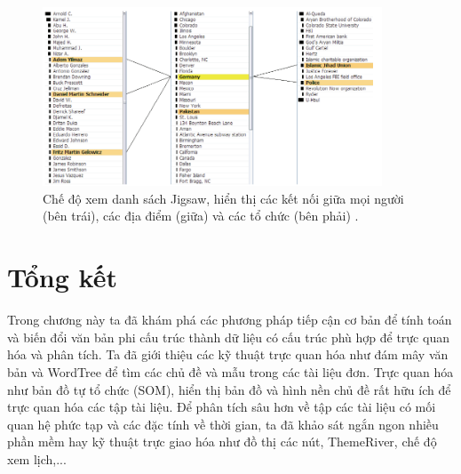 \documentclass[14pt, a4paper]{article}
\numberwithin{equation}{section}
\numberwithin{figure}{section}
\numberwithin{dl}{section}
\numberwithin{md}{section}
\numberwithin{bd}{section}
\numberwithin{dn}{section}
\numberwithin{hq}{section}
\begin{document}
    \begin{figure}[h!]
        \centering
        \includegraphics[width=0.9\textwidth]{20.png}
        \caption{Chế độ xem danh sách Jigsaw, hiển thị các kết nối giữa mọi người (bên trái), các địa điểm (giữa) và các tổ chức (bên phải) \cite{155}.}
        \label{fig:20}
    \end{figure}

    \section{Tổng kết}

    Trong chương này ta đã khám phá các phương pháp tiếp cận cơ bản để tính toán và biến đổi văn bản phi cấu trúc thành dữ liệu có cấu trúc phù hợp để trực quan hóa và phân tích.
    Ta đã giới thiệu các kỹ thuật trực quan hóa như đám mây văn bản và WordTree để tìm các chủ đề và mẫu trong các tài liệu đơn.
    Trực quan hóa như bản đồ tự tổ chức (SOM), hiển thị bản đồ và hình nền chủ đề rất hữu ích để trực quan hóa các tập tài liệu.
    Để phân tích sâu hơn về tập các tài liệu có mối quan hệ phức tạp và các đặc tính về thời gian, ta đã khảo sát ngắn ngon nhiều phần mềm hay kỹ thuật trực giao hóa như đồ thị các nút, ThemeRiver, chế độ xem lịch,...

    
    
    \newpage
    
    \printbibliography[title={TÀI LIỆU THAM KHẢO}]
\end{document}
